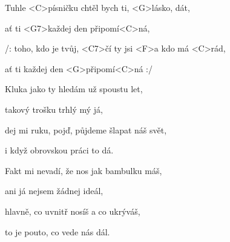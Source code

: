 

\zr
Tuhle <C>písničku chtěl bych ti, <G>lásko, dát,

ať ti <G7>každej den připomí<C>ná,

/: toho, kdo je tvůj, <C7>čí ty jsi <F>a kdo má <C>rád,

ať ti každej den <G>připomí<C>ná :/
\kr

\zs
Kluka jako ty hledám už spoustu let,

takový trošku trhlý mý já,

dej mi ruku, pojď, půjdeme šlapat náš svět,

i když obrovskou práci to dá.
\ks

\zr
\kr

\zs
Fakt mi nevadí, že nos jak bambulku máš,

ani já nejsem žádnej ideál,

hlavně, co uvnitř nosíš a co ukrýváš,

to je pouto, co vede nás dál.
\ks

\zr
\kr

\kp


























